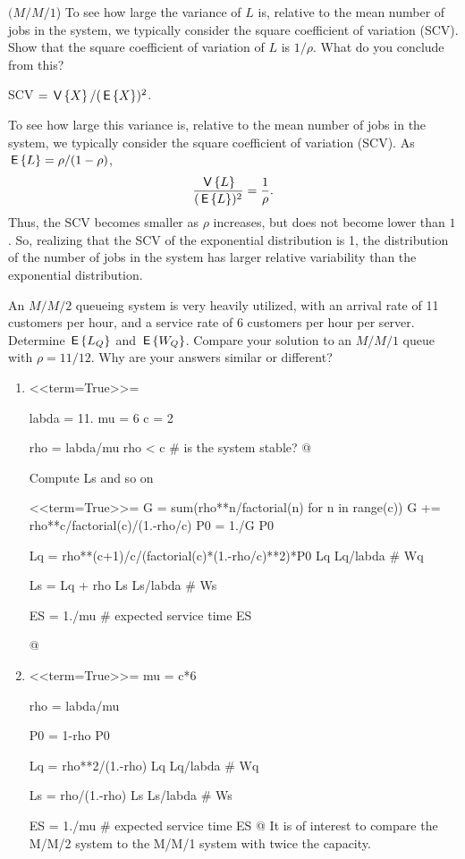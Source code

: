 \begin{exercise}$(M/M/1$) 
To see how large the variance of $L$ is, relative to the mean number of jobs
in the system, we typically consider the square coefficient of
variation (SCV). Show that the square coefficient of variation of $L$ is $1/\rho$. What do you conclude from this?
\begin{hint}
  SCV  $=\,\mathsf{V}\left\{X\right\}/(\,\mathsf{E}\left\{X\right\})^2$. 
\end{hint}
  \begin{solution}
To see how large this variance is, relative to the mean number of jobs
in the system, we typically consider the square coefficient of
variation (SCV). As $\,\mathsf{E}\left\{L\right\} = \rho/(1-\rho)$,
\begin{equation*}
  \frac{\,\mathsf{V}\left\{L\right\}}{(\,\mathsf{E}\left\{L\right\})^2} = \frac 1 \rho.
\end{equation*}
Thus, the SCV becomes smaller as $\rho$ increases, but does not become
lower than $1$. So, realizing that the SCV of the exponential
distribution is 1, the distribution of the number of jobs in the
system has larger relative variability than the exponential
distribution.
  \end{solution}
\end{exercise}


\begin{exercise}
  An $M/M/2$ queueing system is very heavily utilized, with an arrival rate of 11 customers per hour, and a  service rate of 6 customers per hour per server.
 Determine $\,\mathsf{E}\left\{L_Q\right\}$ and $\,\mathsf{E}\left\{W_Q\right\}$. Compare your solution to an $M/M/1$ queue with $\rho=11/12$. Why are your answers similar or different?
  \begin{solution}
  \begin{enumerate}
  \item 

<<term=True>>=

labda = 11.
mu = 6
c = 2

rho = labda/mu
rho < c  # is the system stable?
@ 

Compute Ls and so on


<<term=True>>=
G = sum(rho**n/factorial(n) for n in range(c))
G += rho**c/factorial(c)/(1.-rho/c)
P0 = 1./G
P0

Lq = rho**(c+1)/c/(factorial(c)*(1.-rho/c)**2)*P0
Lq
Lq/labda # Wq

Ls = Lq + rho
Ls
Ls/labda # Ws

ES = 1./mu # expected service time
ES

@ 

\item 

<<term=True>>=
mu = c*6

rho = labda/mu

P0 = 1-rho
P0

Lq = rho**2/(1.-rho)
Lq
Lq/labda # Wq

Ls = rho/(1.-rho)
Ls
Ls/labda # Ws

ES = 1./mu # expected service time
ES
@ 
It is of interest to compare the M/M/2 system to the M/M/1 system with twice the capacity. 
  \end{enumerate}
    \end{solution}
\end{exercise}


